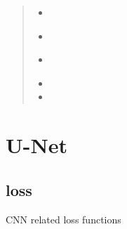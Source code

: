 \documentclass[letterpaper,10pt,english]{sphinxmanual}
\begin{document}
\begin{fulllineitems}
\begin{quote}
\begin{description}
\begin{itemize}
\begin{itemize}
\item {} 

\item {} 
{\hyperref[\detokenize{index:util.load_data.load_train_data}]{}}

\item {} 
{\hyperref[\detokenize{index:util.load_batch.load_batch_parallel}]{}}

\item {} 

\item {} 

\end{itemize}


\end{itemize}

\end{description}\end{quote}

\end{fulllineitems}



\chapter{U-Net}
\label{\detokenize{index:u-net}}

\section{loss}
\label{\detokenize{index:module-unet.loss}}\label{\detokenize{index:loss}}
CNN related loss functions
\end{document}
